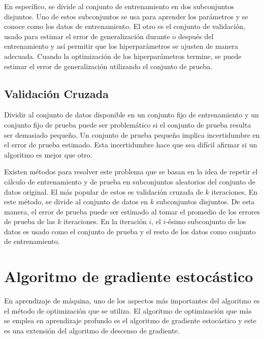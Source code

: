 \vspace{1em}

En específico, se divide al conjunto de entrenamiento en dos subconjuntos disjuntos. Uno de estos subconjuntos se usa para aprender los parámetros y se conoce como los datos de entrenamiento. El otro es el conjunto de validación, usado para estimar el error de generalización durante o después del entrenamiento y así permitir que los hiperparámetros se ajusten de manera adecuada. Cuando la optimización de los hiperparámetros termine, se puede estimar el error de generalización utilizando el conjunto de prueba.
\cite{goodfellow-et-al-2016}
\cite{hastie01statisticallearning}

\subsection{Validación Cruzada}
Dividir al conjunto de datos disponible en un conjunto fijo de entrenamiento y un conjunto fijo de prueba puede ser problemático si el conjunto de prueba resulta ser demasiado pequeño. Un conjunto de prueba pequeño implica incertidumbre en el error de prueba estimado. Esta incertidumbre hace que sea difícil afirmar si un algoritmo es mejor que otro. 

\vspace{1em}

Existen métodos para resolver este problema que se basan en la idea de repetir el cálculo de entrenamiento y de prueba en subconjuntos aleatorios del conjunto de datos original. El más popular de estos es validación cruzada de $k$ iteraciones. En este método, se divide al conjunto de datos en $k$ subconjuntos disjuntos. De esta manera, el error de prueba puede ser estimado al tomar el promedio de los errores de prueba de las $k$ iteraciones. En la iteración $i$, el $i$-ésimo subconjunto de los datos es usado como el conjunto de prueba y el resto de los datos como conjunto de entrenamiento.
\cite{goodfellow-et-al-2016}
\cite{hastie01statisticallearning}


\section{Algoritmo de gradiente estocástico}
En aprendizaje de máquina, uno de los aspectos más importantes del algoritmo es el método de optimización que se utiliza. El algoritmo de optimización que más se emplea en aprendizaje profundo es el algoritmo de gradiente estocástico y este es una extensión del algoritmo de descenso de gradiente. 


